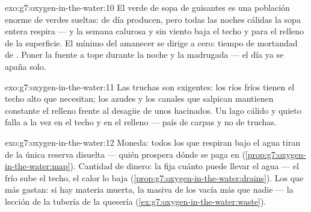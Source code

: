 \begin{solution}{exo:g7:oxygen-in-the-water:10}
El verde de sopa de guisantes es una población enorme de  verdes
sueltas: de día producen, pero todas las noches cálidas la sopa entera
respira --- y la semana calurosa y sin viento baja el techo y para el
relleno de la superficie. El mínimo del amanecer se dirige a cero:
tiempo de mortandad de . Poner la fuente a tope durante la noche y
la madrugada --- el día ya se apaña solo.
\end{solution}

\begin{solution}{exo:g7:oxygen-in-the-water:11}
Las truchas son  exigentes: los ríos fríos tienen el techo alto
que necesitan; los azudes y los canales que salpican mantienen constante
el relleno frente al desagüe de unos  hacinados. Un lago cálido y
quieto falla a la vez en el techo y en el relleno --- país de carpas y
no de truchas.
\end{solution}

\begin{solution}{exo:g7:oxygen-in-the-water:12}
Moneda: todos los que respiran bajo el agua tiran de la única reserva
disuelta --- quién prospera dónde se paga en 
(\cref{prop:g7:oxygen-in-the-water:map}). Cantidad de dinero: la
 fija cuánto puede llevar el agua --- el frío sube el techo,
el calor lo baja (\cref{prop:g7:oxygen-in-the-water:drains}). Los que
más gastan: si hay materia muerta, la  masiva de los
 vacía más que nadie --- la lección de la tubería de la
quesería (\cref{ex:g7:oxygen-in-the-water:waste}).
\end{solution}

